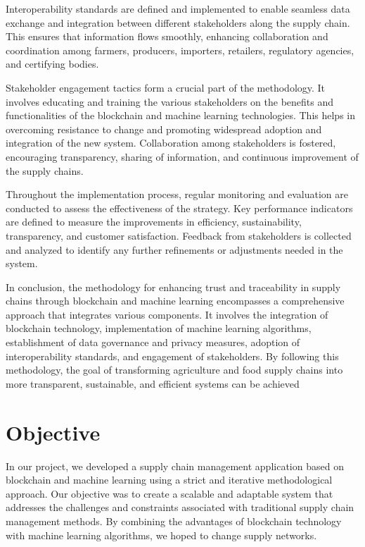 {Interoperability standards are defined and implemented to enable seamless data exchange and integration between different stakeholders along the supply chain. This ensures that information flows smoothly, enhancing collaboration and coordination among farmers, producers, importers, retailers, regulatory agencies, and certifying bodies.

Stakeholder engagement tactics form a crucial part of the methodology. It involves educating and training the various stakeholders on the benefits and functionalities of the blockchain and machine learning technologies. This helps in overcoming resistance to change and promoting widespread adoption and integration of the new system. Collaboration among stakeholders is fostered, encouraging transparency, sharing of information, and continuous improvement of the supply chains.

Throughout the implementation process, regular monitoring and evaluation are conducted to assess the effectiveness of the strategy. Key performance indicators are defined to measure the improvements in efficiency, sustainability, transparency, and customer satisfaction. Feedback from stakeholders is collected and analyzed to identify any further refinements or adjustments needed in the system.

In conclusion, the methodology for enhancing trust and traceability in supply chains through blockchain and machine learning encompasses a comprehensive approach that integrates various components. It involves the integration of blockchain technology, implementation of machine learning algorithms, establishment of data governance and privacy measures, adoption of interoperability standards, and engagement of stakeholders. By following this methodology, the goal of transforming agriculture and food supply chains into more transparent, sustainable, and efficient systems can be achieved}


\section{Objective}
\noindent In our project, we developed a supply chain management application based on blockchain and machine learning using a strict and iterative methodological approach. Our objective was to create a scalable and adaptable system that addresses the challenges and constraints associated with traditional supply chain management methods. By combining the advantages of blockchain technology with machine learning algorithms, we hoped to change supply networks.
